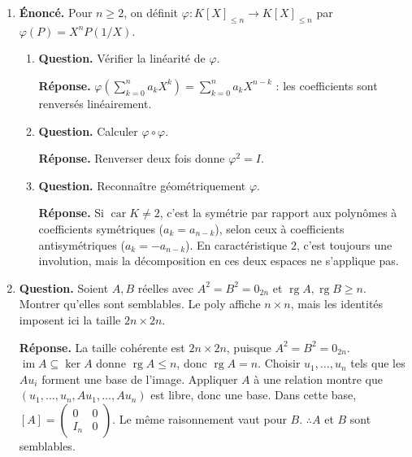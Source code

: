 \documentclass[12pt, a4paper]{article}
\begin{document}
\begin{enumerate}[label=7.\arabic*., start=68]
  \item \begin{minipage}[t]{\linewidth}\raggedright
\textbf{Énoncé.} Pour $n\geq2$, on définit $\varphi:K[X]_{\leq n}\to K[X]_{\leq n}$ par $\varphi(P)=X^nP(1/X)$.

\begin{enumerate}[\arabic*.]
        \item \textbf{Question.} Vérifier la linéarité de $\varphi$.
\par\smallskip
\textbf{Réponse.} $\varphi(\sum_{k=0}^na_kX^k)=\sum_{k=0}^na_kX^{n-k}$ : les coefficients sont renversés linéairement.

  \item \textbf{Question.} Calculer $\varphi\circ\varphi$.
\par\smallskip
\textbf{Réponse.} Renverser deux fois donne $\varphi^2=I$.

  \item \textbf{Question.} Reconnaître géométriquement $\varphi$.
\par\smallskip
\textbf{Réponse.} Si $\operatorname{car}K\neq2$, c'est la symétrie par rapport aux polynômes à coefficients symétriques ($a_k=a_{n-k}$), selon ceux à coefficients antisymétriques ($a_k=-a_{n-k}$).
        En caractéristique $2$, c'est toujours une involution, mais la décomposition en ces deux espaces ne s'applique pas.

\end{enumerate}
\end{minipage}

  \item \begin{minipage}[t]{\linewidth}\raggedright
\textbf{Question.} Soient $A,B$ réelles avec $A^2=B^2=0_{2n}$ et $\operatorname{rg}A,\operatorname{rg}B\geq n$. Montrer qu’elles sont semblables. Le poly affiche $n\times n$, mais les identités imposent ici la taille $2n\times2n$.
\par\smallskip
\textbf{Réponse.} La taille cohérente est $2n\times2n$, puisque $A^2=B^2=0_{2n}$.
    $\operatorname{im}A\subseteq\ker A$ donne $\operatorname{rg}A\leq n$, donc $\operatorname{rg}A=n$.
    Choisir $u_1,\ldots,u_n$ tels que les $Au_i$ forment une base de l'image.
    Appliquer $A$ à une relation montre que $(u_1,\ldots,u_n,Au_1,\ldots,Au_n)$ est libre, donc une base.
    Dans cette base, $[A]=\begin{pmatrix}0&0\\I_n&0\end{pmatrix}$.
    Le même raisonnement vaut pour $B$.
    $\therefore A$ et $B$ sont semblables.
\end{minipage}

\end{enumerate}
\end{document}
